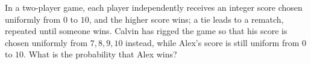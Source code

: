 In a two-player game, each player independently receives an integer score chosen uniformly from $0$ to $10$, and the higher score wins; a tie leads to a rematch, repeated until someone wins. Calvin has rigged the game so that his score is chosen uniformly from $7,8,9,10$ instead, while Alex's score is still uniform from $0$ to $10$. What is the probability that Alex wins?
